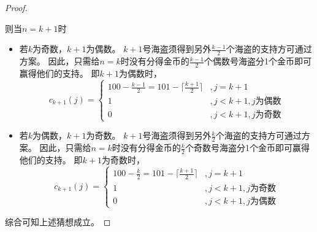 \begin{questions}
\begin{solution}
\begin{proof}
\begin{enumerate}
{                      则当$n=k+1$时
                      \begin{itemize}
                          \item {
                                若$k$为奇数，$k+1$为偶数。
                                $k+1$号海盗须得到另外$\frac{k-1}{2}$个海盗的支持方可通过方案。
                                因此，只需给$n=k$时没有分得金币的$\frac{k-1}{2}$个偶数号海盗分1个金币即可赢得他们的支持。
                                即$k+1$为偶数时，$$
                                    c_{k+1}(j) = \begin{cases}
                                        100 - \frac{k-1}{2} = 101 - \lceil \frac{k+1}{2} \rceil & , j=k+1                  \\
                                        1                                                       & , j<k+1, j \text{为偶数} \\
                                        0                                                       & , j<k+1, j \text{为奇数}
                                    \end{cases}
                                $$
                                }
                          \item {
                                若$k$为偶数，$k+1$为奇数。
                                $k+1$号海盗须得到另外$\frac{k}{2}$个海盗的支持方可通过方案。
                                因此，只需给$n=k$时没有分得金币的$\frac{k}{2}$个奇数号海盗分1个金币即可赢得他们的支持。
                                即$k+1$为奇数时，$$
                                    c_{k+1}(j) = \begin{cases}
                                        100 - \frac{k}{2} = 101 - \lceil \frac{k+1}{2} \rceil & , j=k+1                  \\
                                        1                                                     & , j<k+1, j \text{为奇数} \\
                                        0                                                     & , j<k+1, j \text{为偶数}
                                    \end{cases}
                                $$
                                }
                      \end{itemize}
                      }
            \end{enumerate}
            综合可知上述猜想成立。
        \end{proof}


\end{solution}
\end{questions}
